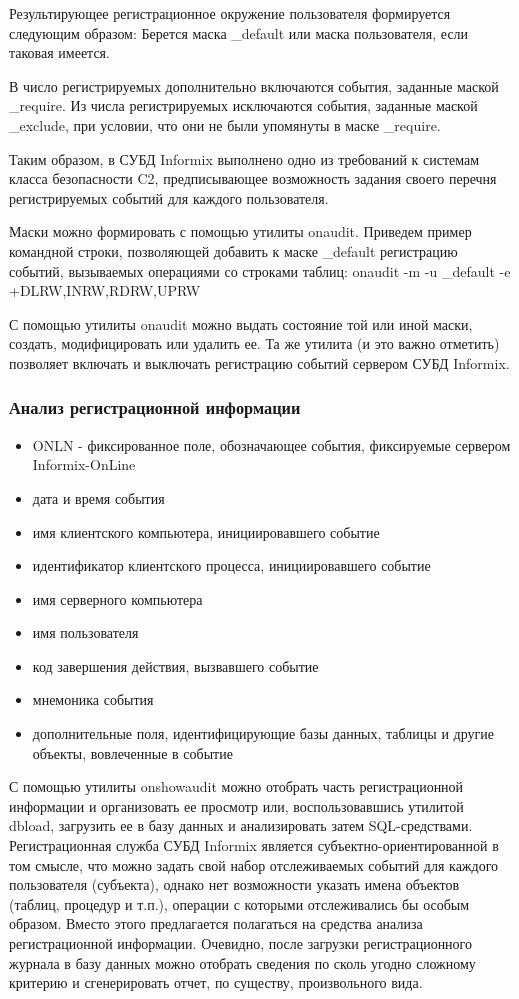 Результирующее регистрационное окружение пользователя формируется следующим образом:
Берется маска \_default или маска пользователя, если таковая имеется.

В число регистрируемых дополнительно включаются события, заданные маской \_require.
Из числа регистрируемых исключаются события, заданные маской \_exclude, при условии, что они не
были упомянуты в маске \_require.

Таким образом, в СУБД Informix выполнено одно из требований к системам класса безопасности C2,
предписывающее возможность задания своего перечня регистрируемых событий для каждого пользователя.

Маски можно формировать с помощью утилиты onaudit. Приведем пример командной строки, позволяющей
добавить к маске \_default регистрацию событий, вызываемых операциями со строками таблиц:
onaudit -m -u \_default -e +DLRW,INRW,RDRW,UPRW

С помощью утилиты onaudit можно выдать состояние той или иной маски, создать, модифицировать или
удалить ее. Та же утилита (и это важно отметить) позволяет включать и выключать регистрацию событий
сервером СУБД Informix.


\subsubsection{Анализ регистрационной информации}
\begin{itemize}
    \item ONLN - фиксированное поле, обозначающее события, фиксируемые сервером Informix-OnLine
    \item дата и время события
    \item имя клиентского компьютера, инициировавшего событие
    \item идентификатор клиентского процесса, инициировавшего событие
    \item имя серверного компьютера
    \item имя пользователя
    \item код завершения действия, вызвавшего событие
    \item мнемоника события
    \item дополнительные поля, идентифицирующие базы данных, таблицы и другие объекты,
        вовлеченные в событие
\end{itemize}

С помощью утилиты onshowaudit можно отобрать часть регистрационной информации и организовать ее
просмотр или, воспользовавшись утилитой dbload, загрузить ее в базу данных и анализировать затем
SQL-средствами. Регистрационная служба СУБД Informix является субъектно-ориентированной в том
смысле, что можно задать свой набор отслеживаемых событий для каждого пользователя (субъекта),
однако нет возможности указать имена объектов (таблиц, процедур и т.п.), операции с которыми
отслеживались бы особым образом. Вместо этого предлагается полагаться на средства анализа
регистрационной информации. Очевидно, после загрузки регистрационного журнала в базу данных можно
отобрать сведения по сколь угодно сложному критерию и сгенерировать отчет, по существу,
произвольного вида.

